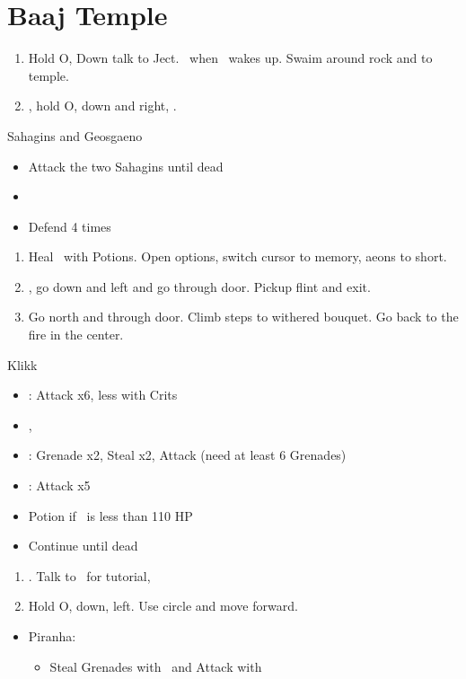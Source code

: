 \chapter{Baaj Temple}

\begin{enumerate}
	\item Hold O, Down talk to Ject. \sd \ when \tidus \ wakes up. Swaim around rock and to temple.
	\item \cs, hold O, down and right, \cs.
\end{enumerate}
\begin{battle}{Sahagins and Geosgaeno}
	\begin{itemize}
		\item Attack the two Sahagins until dead
		\item \cs[0:30]
		\item Defend 4 times
	\end{itemize}
\end{battle}
\begin{enumerate}[resume]
	\item Heal \tidus \ with Potions. Open options, switch cursor to memory, aeons to short.
	\item \cs, go down and left and go through door. Pickup flint and exit.
	\item Go north and through door. Climb steps to withered bouquet. Go back to the fire in the center. \cs[2:10]
\end{enumerate}
\begin{battle}[1500]{Klikk}
	\begin{itemize}
		\item \tidus: Attack x6, less with Crits
		\item \cs, \sd
		\item \rikku: Grenade x2, Steal x2, Attack (need at least 6 Grenades)
		\item \tidus: Attack x5
		\item Potion if \tidus \ is less than 110 HP
		\item Continue until dead
	\end{itemize}
\end{battle}
\begin{enumerate}[resume]
	\item \cs[2:30]. Talk to \rikku \ for tutorial, \sd
	\item Hold O, down, left. Use circle and move forward.
\end{enumerate}
\begin{encounters}
	\begin{itemize}
		\item Piranha:
		\begin{itemize}
			\item Steal Grenades with \rikku \ and Attack with \tidus
		\end{itemize}
	\end{itemize}
\end{encounters}
